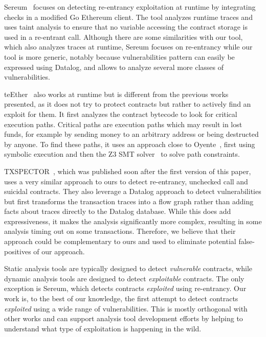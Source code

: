 Sereum~\cite{Rodler2019} focuses on detecting re-entrancy exploitation at runtime by integrating checks in a modified Go Ethereum client.
The tool analyzes runtime traces and uses taint analysis to ensure that no variable accessing the contract storage is used in a re-entrant call.
Although there are some similarities with our tool, which also analyzes traces at runtime, Sereum focuses on re-entrancy while our tool is more generic, notably because vulnerabilities pattern can easily be expressed using Datalog, and allows to analyze several more classes of vulnerabilities.

teEther~\cite{Krupp2018} also works at runtime but is different from the previous works presented, as it does not try to protect contracts but rather to actively find an exploit for them. It first analyzes the contract bytecode to look for critical execution paths.
Critical paths are execution paths which may result in lost funds, for example by sending money to an arbitrary address or being destructed by anyone.
To find these paths, it uses an approach close to Oyente~\cite{Luu2016a}, first using symbolic execution and then the Z3 SMT solver~\cite{de2008z3} to solve path constraints.

TXSPECTOR~\cite{255340}, which was published soon after the first version of this paper, uses a very similar approach to ours to detect re-entrancy, unchecked call and suicidal contracts.
They also leverage a Datalog approach to detect vulnerabilities but first transforms the transaction traces into a flow graph rather than adding facts about traces directly to the Datalog database.
While this does add expressiveness, it makes the analysis significantly more complex, resulting in some analysis timing out on some transactions. Therefore, we believe that their approach could be complementary to ours and used to eliminate potential false-positives of our approach.

 Static analysis tools are typically designed to detect \emph{vulnerable} contracts, while dynamic analysis tools are designed to detect \emph{exploitable} contracts. The only exception is Sereum, which detects contracts \emph{exploited} using re-entrancy.
Our work is, to the best of our knowledge, the first attempt to detect contracts \emph{exploited} using a wide range of vulnerabilities.
This is mostly orthogonal with other works and can support analysis tool development efforts by helping to understand what type of exploitation is happening in the wild.
